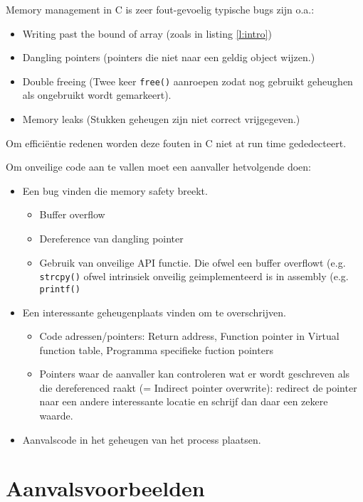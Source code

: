 \documentclass[../main.tex]{subfiles}
\begin{document}
Memory management in C is zeer fout-gevoelig typische bugs zijn o.a.:
\begin{itemize}
		\item Writing past the bound of array (zoals in listing \ref{l:intro})
		\item Dangling pointers (pointers die niet naar een geldig object wijzen.)
		\item Double freeing (Twee keer \lstinline[style=ilcstyle]{free()} aanroepen zodat nog gebruikt geheughen als ongebruikt wordt gemarkeert).
		\item Memory leaks (Stukken geheugen zijn niet correct vrijgegeven.)
\end{itemize}
Om effici\"entie redenen worden deze fouten in C niet at run time gededecteert.

Om onveilige code aan te vallen moet een aanvaller hetvolgende doen:
\begin{itemize}
		\item Een bug vinden die memory safety breekt.
				\begin{itemize}
						\item Buffer overflow
						\item Dereference van dangling pointer
						\item Gebruik van onveilige API functie. Die ofwel een buffer overflowt (e.g. \lstinline[style=ilcstyle]{strcpy()} ofwel intrinsiek onveilig geimplementeerd is in assembly (e.g. \lstinline[style=ilcstyle]{printf()}
				\end{itemize}
		\item Een interessante geheugenplaats vinden om te overschrijven.
				\begin{itemize}
								\item Code adressen/pointers: Return address, Function pointer in Virtual function table, Programma specifieke fuction pointers
								\item Pointers waar de aanvaller kan controleren wat er wordt geschreven als die dereferenced raakt (= Indirect pointer overwrite): redirect de pointer naar een andere interessante locatie en schrijf dan daar een zekere waarde.
				\end{itemize}
		\item Aanvalscode in het geheugen van het process plaatsen.
\end{itemize}

\section{Aanvalsvoorbeelden}
\end{document}
